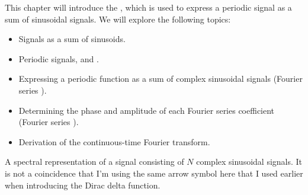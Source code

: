 This chapter will introduce the \emph{}, which is used to express a
periodic signal as a sum of sinusoidal signals.
We will explore the following topics:
\begin{itemize}
  \item Signals as a sum of sinusoids.
  \item Periodic signals, \emph{} and \emph{}.
  \item Expressing a periodic function as a sum of complex sinusoidal signals (Fourier series ).
  \item Determining the phase and amplitude of each Fourier series coefficient (Fourier series ).
  \item Derivation of the continuous-time Fourier transform.
\end{itemize}

\begin{marginfigure}
  \begin{center}
  \end{center}
  \caption{A spectral representation of a signal consisting of $N$ complex sinusoidal signals.
    It is not a coincidence that I'm using the same arrow symbol here that I used earlier when introducing the Dirac delta function.}
  \label{fig:spec_rep}
\end{marginfigure}

